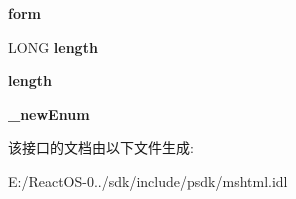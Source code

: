 \begin{DoxyCompactItemize}
\item 
\mbox{\label{interface_m_s_h_t_m_l_1_1_disp_h_t_m_l_select_element_aa2ccfd252dc83a438a7071a8647b80ff}} 
{\bfseries form}
\item 
\mbox{\label{interface_m_s_h_t_m_l_1_1_disp_h_t_m_l_select_element_a8d3ec3542659386bd7c77562f4619922}} 
L\+O\+NG {\bfseries length}
\item 
\mbox{\label{interface_m_s_h_t_m_l_1_1_disp_h_t_m_l_select_element_a820241f522fd580a5fc665fe8c4ebd36}} 
{\bfseries length}
\item 
\mbox{\label{interface_m_s_h_t_m_l_1_1_disp_h_t_m_l_select_element_ae5c3ca0c1050b617fa026bc2afc2fe10}} 
{\bfseries \+\_\+new\+Enum}
\end{DoxyCompactItemize}


该接口的文档由以下文件生成\+:\begin{DoxyCompactItemize}
\item 
E\+:/\+React\+O\+S-\/0../sdk/include/psdk/mshtml.\+idl\end{DoxyCompactItemize}
